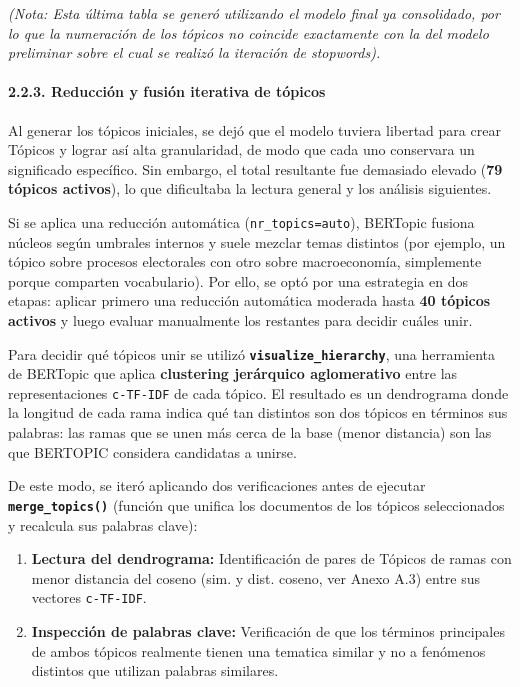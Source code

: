 \documentclass[
]{article}
\begin{document}
\emph{(Nota: Esta última tabla se generó utilizando el modelo final ya
consolidado, por lo que la numeración de los tópicos no coincide
exactamente con la del modelo preliminar sobre el cual se realizó la
iteración de stopwords).}

\paragraph{2.2.3. Reducción y fusión iterativa de
tópicos}\label{reducciuxf3n-y-fusiuxf3n-iterativa-de-tuxf3picos}

Al generar los tópicos iniciales, se dejó que el modelo tuviera libertad
para crear Tópicos y lograr así alta granularidad, de modo que cada uno
conservara un significado específico. Sin embargo, el total resultante
fue demasiado elevado (\textbf{79 tópicos activos}), lo que dificultaba
la lectura general y los análisis siguientes.

Si se aplica una reducción automática (\texttt{nr\_topics=\textquotedbl{}auto\textquotedbl{}}),
BERTopic fusiona núcleos según umbrales internos y suele mezclar temas
distintos (por ejemplo, un tópico sobre procesos electorales con otro
sobre macroeconomía, simplemente porque comparten vocabulario). Por
ello, se optó por una estrategia en dos etapas: aplicar primero una
reducción automática moderada hasta \textbf{40 tópicos activos} y luego
evaluar manualmente los restantes para decidir cuáles unir.

Para decidir qué tópicos unir se utilizó
\textbf{\texttt{visualize\_hierarchy}}, una herramienta de BERTopic que
aplica \textbf{clustering jerárquico aglomerativo} entre las
representaciones \texttt{c-TF-IDF} de cada tópico. El resultado es un
dendrograma donde la longitud de cada rama indica qué tan distintos son
dos tópicos en términos sus palabras: las ramas que se unen más cerca de
la base (menor distancia) son las que BERTOPIC considera candidatas a
unirse.

De este modo, se iteró aplicando dos verificaciones antes de ejecutar
\textbf{\texttt{merge\_topics()}} (función que unifica los documentos de
los tópicos seleccionados y recalcula sus palabras clave):

\begin{enumerate}
\def\labelenumi{\arabic{enumi}.}
\item
  \textbf{Lectura del dendrograma:} Identificación de pares de Tópicos
  de ramas con menor distancia del coseno (sim. y dist. coseno, ver
  Anexo A.3) entre sus vectores \texttt{c-TF-IDF}.
\item
  \textbf{Inspección de palabras clave:} Verificación de que los
  términos principales de ambos tópicos realmente tienen una tematica
  similar y no a fenómenos distintos que utilizan palabras similares.
\end{enumerate}
\end{document}
